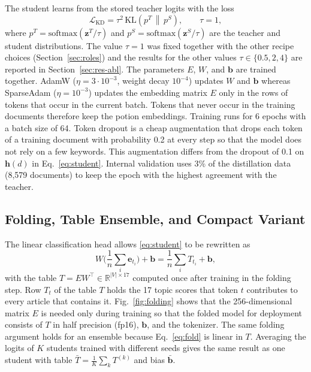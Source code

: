 \documentclass{ieeeaccess}
\begin{document}
The student learns from the stored teacher logits with the loss
\begin{equation}
\mathcal{L}_{\mathrm{KD}}=\tau^{2}\,\mathrm{KL}\!\left(p^{T}\,\middle\|\,p^{S}\right),\qquad \tau=1 ,
\label{eq:kd}
\end{equation}
where $p^{T}=\mathrm{softmax}(\mathbf{z}^{T}/\tau)$ and $p^{S}=\mathrm{softmax}(\mathbf{z}^{S}/\tau)$ are the teacher and student distributions. The value $\tau=1$ was fixed together with the other recipe choices (Section~\ref{sec:roles}) and the results for the other values $\tau\in\{0.5,2,4\}$ are reported in Section~\ref{sec:res-abl}. The parameters $E$, $W$, and $\mathbf{b}$ are trained together. AdamW ($\eta=3\cdot 10^{-3}$, weight decay $10^{-4}$) updates $W$ and $\mathbf{b}$ whereas SparseAdam ($\eta=10^{-3}$) updates the embedding matrix $E$ only in the rows of tokens that occur in the current batch. Tokens that never occur in the training documents therefore keep the potion embeddings. Training runs for 6 epochs with a batch size of 64. Token dropout is a cheap augmentation that drops each token of a training document with probability 0.2 at every step so that the model does not rely on a few keywords. This augmentation differs from the dropout of 0.1 on $\mathbf{h}(d)$ in Eq.~\eqref{eq:student}. Internal validation uses 3\% of the distillation data (8,579 documents) to keep the epoch with the highest agreement with the teacher.

\subsection{Folding, Table Ensemble, and Compact Variant}
\label{sec:fold}
The linear classification head allows \eqref{eq:student} to be rewritten as
\begin{equation}
W\Big(\frac{1}{n}\sum_{i}\mathbf{e}_{t_i}\Big)+\mathbf{b}=\frac{1}{n}\sum_{i}T_{t_i}+\mathbf{b},
\label{eq:fold}
\end{equation}
with the table $T=EW^{\top}\in\mathbb{R}^{|V|\times 17}$ computed once after training in the folding step. Row $T_t$ of the table $T$ holds the 17 topic scores that token $t$ contributes to every article that contains it. Fig.~\ref{fig:folding} shows that the 256-dimensional matrix $E$ is needed only during training so that the folded model for deployment consists of $T$ in half precision (fp16), $\mathbf{b}$, and the tokenizer. The same folding argument holds for an ensemble because Eq.~\eqref{eq:fold} is linear in $T$. Averaging the logits of $K$ students trained with different seeds gives the same result as one student with table $\bar{T}=\frac{1}{K}\sum_k T^{(k)}$ and bias $\bar{\mathbf{b}}$.
\end{document}
